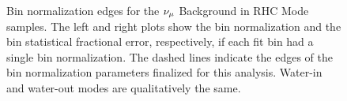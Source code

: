 \begin{figure}


\caption[Bin Normalizations for the $\numu$ Background in RHC Mode Samples]{Bin normalization edges for the $\protect\nu_{\mu}$ Background in RHC
Mode samples. The left and right plots show the bin normalization
and the bin statistical fractional error, respectively, if each fit
bin had a single bin normalization. The dashed lines indicate the
edges of the bin normalization parameters finalized for this analysis.
Water-in and water-out modes are qualitatively the same.\label{fig:Bin-normalization-edgesNuMuRHC}}
\end{figure}

